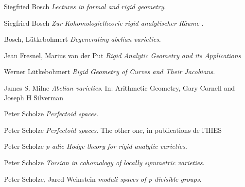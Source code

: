 \documentclass[11pt,oneside]{amsart}
\theoremstyle{definition}
\theoremstyle{remark}
\begin{document}
	
	\begin{thebibliography}{9}
		
		Siegfried Bosch
		\textit{Lectures in formal and rigid geometry}.
		
		Siegfried Bosch
		\textit{Zur Kohomologietheorie rigid analytischer R\"aume }.
		
		Bosch, L\"utkebohmert
		\textit{Degenerating abelian varieties}.
		
		Jean Fresnel, Marius van der Put
		\textit{Rigid Analytic Geometry and its Applications}
		
		
		Werner L\"utkebohmert
		\textit{Rigid Geometry of Curves and Their Jacobians}. 
		
		James S. Milne
		\textit{Abelian varieties}.
		In: Arithmetic Geometry, Gary Cornell and Joseph H Silverman
			
		Peter Scholze
		\textit{Perfectoid spaces}. 
		
		Peter Scholze
		\textit{Perfectoid spaces}. The other one, in publications de l'IHES 
		
		Peter Scholze
		\textit{p-adic Hodge theory for rigid analytic varieties}.
		
		Peter Scholze
		\textit{Torsion in cohomology of locally symmetric varieties}.
		
		Peter Scholze, Jared Weinstein
		\textit{moduli spaces of p-divisible groups}.
		
		
		
	\end{thebibliography}
	
	
	
	
	
	
	
	
	
	
	
	
	
	
\end{document}
